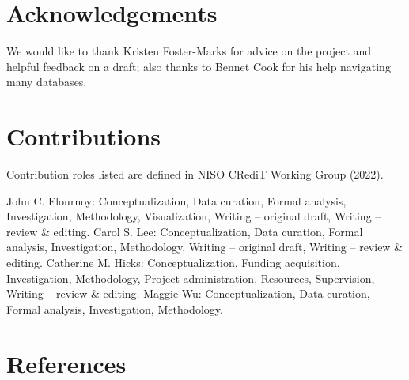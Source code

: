 \documentclass[
]{article}
\begin{document}
\section{Acknowledgements}\label{acknowledgements}

We would like to thank Kristen Foster-Marks for advice on the project
and helpful feedback on a draft; also thanks to Bennet Cook for his help
navigating many databases.

\section{Contributions}\label{contributions}

Contribution roles listed are defined in NISO CRediT Working Group
(2022).

John C. Flournoy: Conceptualization, Data curation, Formal analysis,
Investigation, Methodology, Visualization, Writing -- original draft,
Writing -- review \& editing. Carol S. Lee: Conceptualization, Data
curation, Formal analysis, Investigation, Methodology, Writing --
original draft, Writing -- review \& editing. Catherine M. Hicks:
Conceptualization, Funding acquisition, Investigation, Methodology,
Project administration, Resources, Supervision, Writing -- review \&
editing. Maggie Wu: Conceptualization, Data curation, Formal analysis,
Investigation, Methodology.

\section*{References}\label{references}
\end{document}
